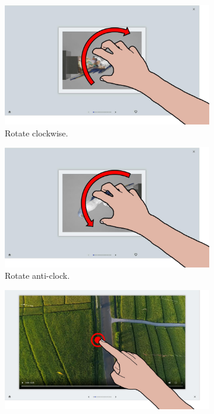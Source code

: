 \begin{figure}[ht]
    \begin{subfigure}{.24\textwidth}
        \centering
        \includegraphics[width=.97\linewidth]{Figures/LUI/Gestures/rotate_clockwise.pdf}  
        \vspace{-6pt}
        \captionsetup{width=.9\linewidth}
        \caption{Rotate clockwise.}
        \label{fig:lui:gestures:rotate-anticlock}
    \end{subfigure}
    \begin{subfigure}{.24\textwidth}
        \centering
        \includegraphics[width=.97\linewidth]{Figures/LUI/Gestures/rotate_counterclockwise.pdf}  
        \vspace{-6pt}
        \captionsetup{width=.9\linewidth}
        \caption{Rotate anti-clock.}
        \label{fig:lui:gestures:rotate-clock}
    \end{subfigure}
    \begin{subfigure}{.24\textwidth}
        \centering
        \includegraphics[width=.97\linewidth]{Figures/LUI/Gestures/tap-play.pdf} 

\end{subfigure}
\end{figure}
